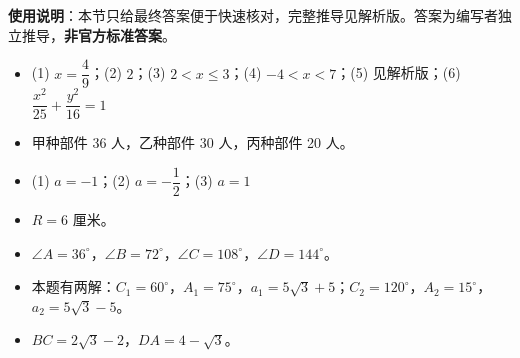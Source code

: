 
\begin{gknotice}
\textbf{使用说明}：本节只给最终答案便于快速核对，完整推导见解析版。答案为编写者独立推导，\textbf{非官方标准答案}。
\end{gknotice}

\begin{itemize}[leftmargin=2.6em]
  \item[\textbf{1.}] (1) $x=\dfrac49$；(2) $2$；(3) $2<x\le3$；(4) $-4<x<7$；(5) 见解析版；(6) $\dfrac{x^2}{25}+\dfrac{y^2}{16}=1$
  \item[\textbf{2.}] 甲种部件 36 人，乙种部件 30 人，丙种部件 20 人。
  \item[\textbf{3.}] (1) $a=-1$；(2) $a=-\dfrac12$；(3) $a=1$
  \item[\textbf{4.}] $R=6$ 厘米。
  \item[\textbf{5.}] $\angle A=36^\circ$，$\angle B=72^\circ$，$\angle C=108^\circ$，$\angle D=144^\circ$。
  \item[\textbf{6.}] 本题有两解：$C_1=60^\circ$，$A_1=75^\circ$，$a_1=5\sqrt3+5$；$C_2=120^\circ$，$A_2=15^\circ$，$a_2=5\sqrt3-5$。
  \item[\textbf{7.}] $BC=2\sqrt3-2$，$DA=4-\sqrt3$。
\end{itemize}
